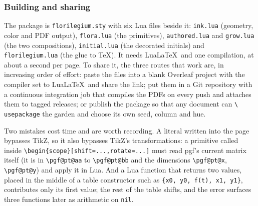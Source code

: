 
\subsubsection{Building and sharing}

The package is \texttt{florilegium.sty} with six Lua files beside it:
\texttt{ink.lua}
(geometry, color and PDF output), \texttt{flora.lua} (the primitives),
\texttt{authored.lua} and \texttt{grow.lua} (the two compositions),
\texttt{initial.lua}
(the decorated initials) and \texttt{florilegium.lua} (the glue to
\TeX). It needs Lua\LaTeX\ and one compilation, at
about a second per page. To share it, the three routes that work are,
in increasing order
of effort: paste the files into a blank Overleaf project with the
compiler set to
Lua\LaTeX\ and share the link; put them in a Git repository with a
continuous integration
job that compiles the PDFs on every push and attaches them to tagged
releases; or publish
the package so that any document can \texttt{\textbackslash
usepackage} the garden and
choose its own seed, column and hue.

\begin{remark}
  Two mistakes cost time and are worth recording. A literal written
  into the page bypasses
  TikZ, so it also bypasses TikZ's transformations: a primitive called inside
  \verb|\begin{scope}[shift=...,rotate=...]| must read pgf's current
  matrix itself (it is in
    \verb|\pgf@pt@aa| to \verb|\pgf@pt@bb| and the dimensions \verb|\pgf@pt@x|,
  \verb|\pgf@pt@y|) and apply it in Lua. And a Lua function that
  returns two values, placed
  in the middle of a table constructor such as
  \verb|{x0, y0, f(t), x1, y1}|, contributes only
  its first value; the rest of the table shifts, and the error
  surfaces three functions
  later as arithmetic on \texttt{nil}.
\end{remark}
